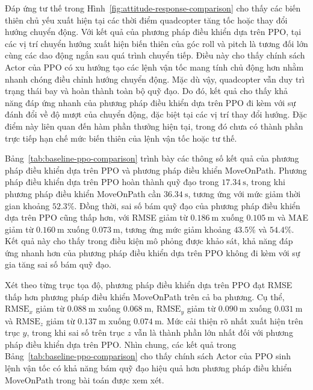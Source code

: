 Đáp ứng tư thế trong Hình~\ref{fig:attitude-response-comparison} cho thấy các biến thiên chủ yếu xuất hiện tại các thời điểm quadcopter tăng tốc hoặc
thay đổi hướng chuyển động. Với kết quả của phương pháp điều khiển dựa trên PPO, tại các vị trí chuyển hướng xuất hiện biến thiên của góc roll và pitch là tương đối lớn cùng
các dao động ngắn sau quá trình chuyển tiếp. Điều này cho thấy chính sách Actor của PPO có xu hướng tạo các lệnh vận tốc mang tính chủ động hơn nhằm nhanh chóng
điều chỉnh hướng chuyển động. Mặc dù vậy, quadcopter vẫn duy trì trạng thái bay và hoàn thành toàn bộ quỹ đạo. Do đó, kết quả cho thấy khả năng đáp ứng nhanh
của phương pháp điều khiển dựa trên PPO đi kèm với sự đánh đổi về độ mượt của chuyển động, đặc biệt tại các vị trí thay đổi hướng. Đặc điểm này liên quan đến hàm phần thưởng hiện tại, trong đó
chưa có thành phần trực tiếp hạn chế mức biến thiên của lệnh vận tốc hoặc tư thế.



Bảng~\ref{tab:baseline-ppo-comparison} trình bày các thông số kết quả của phương pháp điều khiển dựa trên PPO và phương pháp điều khiển MoveOnPath. Phương pháp điều khiển dựa trên PPO hoàn thành quỹ đạo trong \(17.34~\mathrm{s}\), trong khi
phương pháp điều khiển MoveOnPath cần \(36.34~\mathrm{s}\), tương ứng với mức giảm thời gian khoảng \(52.3\%\). Đồng thời, sai số bám quỹ đạo của phương pháp điều khiển dựa trên PPO cũng thấp hơn, với RMSE giảm từ \(0.186~\mathrm{m}\) xuống \(0.105~\mathrm{m}\) và MAE giảm từ \(0.160~\mathrm{m}\) xuống \(0.073~\mathrm{m}\), tương ứng mức giảm khoảng \(43.5\%\) và \(54.4\%\). Kết quả này cho thấy trong điều kiện mô phỏng được khảo sát, khả năng đáp ứng nhanh hơn của phương pháp điều khiển dựa trên PPO không đi kèm với sự gia tăng sai số bám quỹ đạo.

Xét theo từng trục tọa độ, phương pháp điều khiển dựa trên PPO đạt RMSE thấp hơn phương pháp điều khiển MoveOnPath trên cả ba phương. Cụ thể, \(\mathrm{RMSE}_x\) giảm từ \(0.088~\mathrm{m}\) xuống \(0.068~\mathrm{m}\), \(\mathrm{RMSE}_y\) giảm từ \(0.090~\mathrm{m}\) xuống \(0.031~\mathrm{m}\) và \(\mathrm{RMSE}_z\) giảm từ \(0.137~\mathrm{m}\) xuống \(0.074~\mathrm{m}\). Mức cải thiện rõ nhất xuất hiện trên trục \(y\), trong khi sai số trên trục \(z\) vẫn là thành phần lớn nhất đối với phương pháp điều khiển dựa trên PPO. Nhìn chung, các kết quả trong Bảng~\ref{tab:baseline-ppo-comparison} cho thấy chính sách Actor của PPO sinh lệnh vận tốc có khả năng bám quỹ đạo hiệu quả hơn phương pháp điều khiển MoveOnPath trong bài toán được xem xét.

